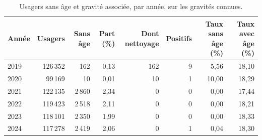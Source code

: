 \begin{table}[htbp]
\centering\small
\renewcommand{\arraystretch}{1.18}
\caption{Usagers sans âge et gravité associée, par année, sur les gravités connues.}\label{tab:ages-manquants}
\begin{tabularx}{\textwidth}{@{}lrrrrrrr@{}}
\toprule
Année & Usagers & Sans âge & Part (\%) & Dont nettoyage & Positifs & Taux sans âge (\%) & Taux avec âge (\%) \\
\midrule
2019 & 126\,352 & 162 & 0,13 & 162 & 9 & 5,56 & 18,10 \\
2020 & 99\,169 & 10 & 0,01 & 10 & 1 & 10,00 & 18,29 \\
2021 & 122\,135 & 2\,860 & 2,34 & 0 & 0 & 0,00 & 17,44 \\
2022 & 119\,423 & 2\,518 & 2,11 & 0 & 0 & 0,00 & 18,21 \\
2023 & 118\,101 & 2\,350 & 1,99 & 0 & 0 & 0,00 & 18,33 \\
2024 & 117\,278 & 2\,419 & 2,06 & 0 & 1 & 0,04 & 18,30 \\
\bottomrule
\end{tabularx}
\end{table}
